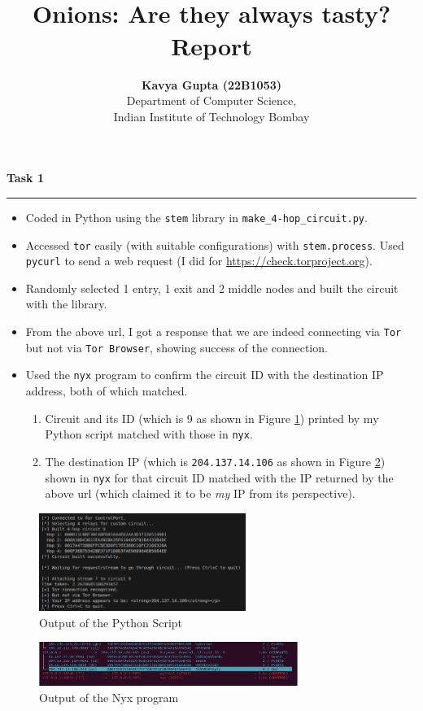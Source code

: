 \documentclass[a4paper,12pt]{article}
\title{\cooltitle{CS790 Assignment 3} \\
\LARGE \textbf{Onions: Are they always tasty?} \\
Report}
\author{{\bf Kavya Gupta (22B1053)} \\
\small Department of Computer Science, \\
Indian Institute of Technology Bombay \\}
\date{}
\newenvironment{solution}[2][]{%
\begin{mdframed}[linecolor=blue!70!black, linewidth=2pt, roundcorner=10pt, backgroundcolor=yellow!10!white, skipabove=12pt, skipbelow=12pt]%
	\textbf{\large #2}
	\par\noindent\rule{\textwidth}{0.4pt}
}{
\end{mdframed}
}
\begin{document}
\maketitle

\begin{solution}{Task 1}
    \begin{itemize}
        \item Coded in Python using the \texttt{stem} library in \texttt{make\_4-hop\_circuit.py}.
        \item Accessed \texttt{tor} easily (with suitable configurations) with \texttt{stem.process}. Used \texttt{pycurl} to send a web request (I did for \url{https://check.torproject.org}).
        \item Randomly selected 1 entry, 1 exit and 2 middle nodes and built the circuit with the library.
        \item From the above url, I got a response that we are indeed connecting via \texttt{Tor} but not via \texttt{Tor Browser}, showing success of the connection.
        \item Used the \texttt{nyx} program to confirm the circuit ID with the destination IP address, both of which matched.
        \begin{enumerate}
            \item Circuit and its ID (which is 9 as shown in Figure \ref{task_1}) printed by my Python script matched with those in \texttt{nyx}.
            \item The destination IP (which is \texttt{204.137.14.106} as shown in Figure \ref{nyx}) shown in \texttt{nyx} for that circuit ID matched with the IP returned by the above url (which claimed it to be \textit{my} IP from its perspective).
        \end{enumerate}
    \end{itemize}
    \begin{figure}[H]
        \centering
        \includegraphics[width=0.6\textwidth]{../Task 1.png}
        \caption{Output of the Python Script}
        \label{task_1}
    \end{figure}
    \begin{figure}[H]
        \centering
        \includegraphics[width=0.75\textwidth]{../Task 1 Nyx.png}
        \caption{Output of the Nyx program}
        \label{nyx}
    \end{figure}
\end{solution}
\end{document}
